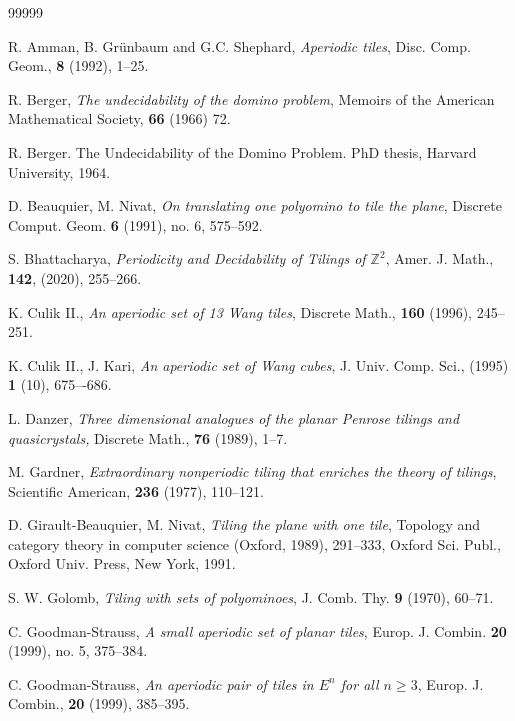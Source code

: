 \documentclass[reqno,a4paper,12pt]{amsart}
\numberwithin{equation}{section}
\numberwithin{figure}{section}
\def\Z{\mathbb{Z}}
\renewcommand\geq{\geqslant}
\theoremstyle{plain}
\theoremstyle{definition}
\begin{document}
	
		\begin{thebibliography}{99999}
		
		R. Amman, B. Gr\"unbaum and G.C. Shephard, \emph{Aperiodic tiles}, Disc. Comp. Geom., \textbf{8} (1992), 1--25.

		 R. Berger, \emph{The undecidability of the domino problem}, Memoirs of the American Mathematical Society,    \textbf{66}  (1966) 72.
		 
		R. Berger. The Undecidability of the Domino Problem. PhD thesis, Harvard University, 1964.
		
		D. Beauquier, M. Nivat, \emph{On translating one polyomino to tile the plane}, Discrete Comput. Geom. \textbf{6} (1991), no. 6, 575--592.
		
		S. Bhattacharya,  \emph{Periodicity and Decidability of Tilings of $\Z^2$}, 
		Amer. J. Math., \textbf{142}, (2020),  255--266.
		
		K. Culik II., 
		\emph{An aperiodic set of 13 Wang tiles},
		 Discrete Math., \textbf{160} (1996),  245--251.
		 
		 K. Culik II.,  J. Kari,
		 \emph{An aperiodic set of Wang cubes}, J. Univ. Comp. Sci., (1995) \textbf{1} (10), 675–-686.
	
	    L. Danzer, \emph{Three dimensional analogues of the planar Penrose tilings and quasicrystals,} Discrete
Math., \textbf{76} (1989), 1--7.

		 M. Gardner, \emph{Extraordinary nonperiodic tiling that enriches the theory of tilings}, Scientific American, \textbf{236} (1977), 110--121.

D. Girault-Beauquier, M. Nivat, \emph{Tiling the plane with one tile}, Topology and category theory in computer science (Oxford, 1989), 291–333, Oxford Sci. Publ., Oxford Univ. Press, New York, 1991.

S. W. Golomb, \emph{Tiling with sets of polyominoes}, J. Comb. Thy. \textbf{9} (1970), 60--71.

		C. Goodman-Strauss, \emph{A small aperiodic set of planar tiles}, Europ. J. Combin. \textbf{20} (1999), no. 5, 375--384.
		 
		C. Goodman-Strauss, \emph{An aperiodic pair of tiles in $E^n$ for all $n \geq 3$}, Europ. J. Combin., \textbf{20} (1999), 385--395.
		

\end{thebibliography}
\end{document}
